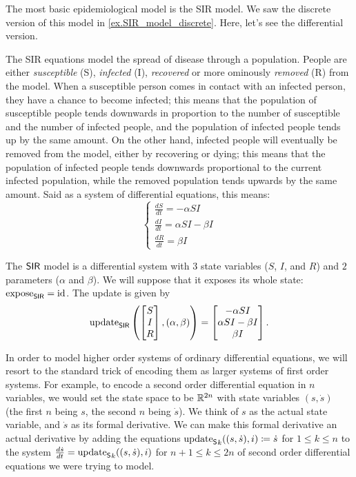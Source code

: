 \documentclass[DynamicalBook]{subfiles}
\begin{document}
\begin{example}\label{ex.sir_model_diff}
  The most basic epidemiological model is the SIR model. We saw the discrete version of this model in \cref{ex.SIR_model_discrete}. Here, let's see the differential version.

  The SIR equations model the spread
  of disease through a population. People are either \emph{susceptible} (S),
  \emph{infected} (I), \emph{recovered} or more ominously \emph{removed} (R)
  from the model. When a susceptible person comes in contact with an infected
  person, they have a chance to become infected; this means that the population
  of susceptible people tends downwards in proportion to the number of
  susceptible and the number of infected people, and the population of infected
  people tends up by the same amount. On the other hand, infected people will
  eventually be removed from the model, either by recovering or dying; this
  means that the population of infected people tends downwards proportional to
  the current infected population, while the removed population tends upwards by
  the same amount. Said as a system of differential equations, this means:
  \begin{equation}\label{eqn.sir_model_diff}
    \begin{cases}
      \frac{dS}{dt} = -\alpha S I \\
      \frac{dI}{dt} = \alpha S I - \beta I \\
      \frac{dR}{dt} = \beta I
    \end{cases}
  \end{equation}

  The $\mathsf{SIR}$ model is a differential system with $3$ state variables ($S$,
  $I$, and $R$) and $2$ parameters ($\alpha$ and $\beta$). We will suppose that
  it exposes its whole state: $\mathrm{expose}_{\mathsf{SIR}} = \mathrm{id}$. The update is given by 
\[
\mathrm{update}_{\mathsf{SIR}}\left( \begin{bmatrix} S\\ I \\ R \end{bmatrix}, (\alpha, \beta)
\right) = \begin{bmatrix} -\alpha S I \\ \alpha S I - \beta I \\ \beta I\end{bmatrix}.
\]
\end{example}


  In order to model higher order systems of ordinary differential equations, we will resort
  to the standard trick of encoding them as larger systems of first order
  systems. For example, to encode a second order differential equation in $n$
  variables, we would set the state space to be $\mathbb{R}^{2n}$ with state variables
  $(s, \dot{s})$ (the first $n$ being $s$, the second $n$ being $\dot{s}$). We think of $s$ as the actual state variable, and $\dot{s}$ as its formal derivative. We can make this formal derivative an actual derivative by adding the equations ${\mathrm{update}_{\mathsf{S}}}_{k}((s, \dot{s}), i) \coloneqq \dot{s}$ for $1 \leq k \leq n$ to the system
  $\frac{d\dot{s}}{dt} = {\mathrm{update}_{\mathsf{S}}}_{k}((s, \dot{s}), i)$ for $n + 1 \leq k \leq 2n$ of second order
  differential equations we were trying to model.
  
\end{document}
